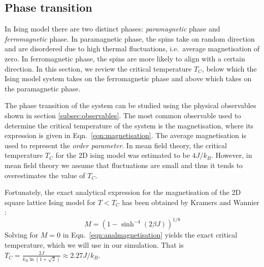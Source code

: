 \documentclass[pra,aps,superscriptaddress,amssymb,amsmath,reprint,noeprint,floatfix]{revtex4-2}
\begin{document}
\subsection{\label{subsec:phasetransition}Phase transition}
In Ising model there are two distinct phases: \textit{paramagnetic} phase and \textit{ferromagnetic} phase. In paramagnetic phase, the spins take on random direction and are disordered due to high thermal fluctuations, i.e.\ average magnetisation of zero. In ferromagnetic phase, the spins are more likely to align with a certain direction. In this section, we review the critical temperature $T_C$, below which the Ising model system takes on the ferromagnetic phase and above which takes on the paramagnetic phase.


The phase transition of the system can be studied using the physical observables shown in section \ref{subsec:observables}. The most common observable used to determine the critical temperature of the system is the magnetisation, where its expression is given in Eqn.\ \ref{eqn:magnetisation}. The average magnetisation is used to represent the \textit{order parameter}. In mean field theory, the critical temperature $T_C$ for the 2D ising model was estimated to be $4J/k_B$. However, in mean field theory we assume that fluctuations are small and thus it tends to overestimates the value of $T_C$. 

Fortunately, the exact analytical expression for the magnetisation of the 2D square lattice Ising model for $T<T_C$ has been obtained by Kramers and Wannier \cite{PhysRev.60.252}:
\begin{equation}\label{eqn:analmagnetisation}
    M=\left(1-\sinh^{-4}{(2\beta J)}\right)^{1/8}
\end{equation}
Solving for $M=0$ in Eqn.\ \ref{eqn:analmagnetisation} yields the exact critical temperature, which we will use in our simulation. That is $T_C=\frac{2J}{k_B \ln{\left(1+\sqrt{2}\right)}}\approx2.27J/k_B$.
\end{document}
